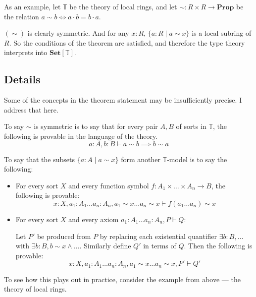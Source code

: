 \documentclass{article}
\newcommand*{\Prop}{\mathbf{Prop}}
\newcommand*{\Set}{\mathbf{Set}}
\newcommand*{\T}{\mathbb{T}}
\begin{document}
As an example, let \(\T\) be the theory of local rings, and let \(\sim : R \times R \to \Prop\) be the relation \(a \sim b \iff a \cdot b = b \cdot a\).

\((\sim)\) is clearly symmetric. And for any \(x : R\), \(\{a : R \mid a \sim x\}\) is a local subring of \(R\).
So the conditions of the theorem are satisfied, and therefore the type theory interprets into \(\Set[\T]\).

\subsection{Details} \label{Details}

Some of the concepts in the theorem statement may be insufficiently precise. I address that here.

To say \(\sim\) is symmetric is to say that for every pair \(A,B\) of sorts in \(\T\),
the following is provable in the language of the theory.
\[a : A, b : B \vdash a \sim b \implies b \sim a\]

To say that the subsets \(\{a : A \mid a \sim x\}\) form another \(\T\)-model is to say the following:
\begin{itemize}
    \item For every sort \(X\) and every function symbol \(f : A_1 \times \dots \times A_n \to B\), the following is provable:
    \[x : X, a_1 : A_1 \dots a_n : A_n, a_1 \sim x \dots a_n \sim x \vdash f(a_1 \dots a_n) \sim x\]
    \item For every sort \(X\) and every axiom \(a_1 : A_1 \dots a_n : A_n, P \vdash Q\):
    
    Let \(P'\) be produced from \(P\)
    by replacing each existential quantifier \(\exists b : B, \dots\)
    with \(\exists b : B, b \sim x \land \dots\).
    Similarly define \(Q'\) in terms of \(Q\).
    Then the following is provable:
    \[x : X, a_1 : A_1 \dots a_n : A_n, a_1 \sim x \dots a_n \sim x, P' \vdash Q'\]
\end{itemize}

To see how this plays out in practice, consider the example from above --- the theory of local rings.
\end{document}
